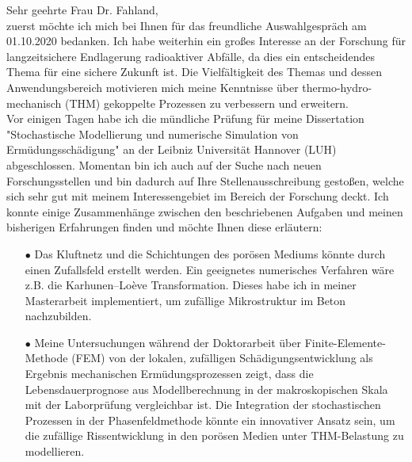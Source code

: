 \begin{adjustwidth}{0cm}{1cm}
	Sehr geehrte Frau Dr. Fahland,\\[1em]
	 zuerst möchte ich mich bei Ihnen  für das freundliche Auswahlgespräch am 01.10.2020 bedanken. Ich habe weiterhin ein großes Interesse an der Forschung für langzeitsichere Endlagerung radioaktiver Abfälle, da dies ein entscheidendes Thema für eine sichere Zukunft ist. %
	 Die Vielfältigkeit des Themas und dessen Anwendungsbereich motivieren mich meine Kenntnisse über thermo-hydro-mechanisch (THM) gekoppelte Prozessen zu verbessern und erweitern.\\[1em]
	  Vor einigen Tagen habe ich die mündliche Prüfung für meine Dissertation "Stochastische Modellierung und numerische Simulation von Ermüdungsschädigung" an der Leibniz Universität Hannover (LUH) abgeschlossen. Momentan bin ich auch auf der Suche nach neuen Forschungsstellen und bin dadurch auf Ihre Stellenausschreibung gestoßen, welche sich sehr gut mit meinem Interessengebiet im Bereich der Forschung deckt. %
	 Ich konnte einige Zusammenhänge zwischen den beschriebenen Aufgaben und meinen bisherigen Erfahrungen finden und möchte Ihnen diese  erläutern:\\[-0.5em]
		\begin{adjustwidth}{0.5cm}{0cm}
					\begin{itemize}	
	\item[$\bullet$] Das Kluftnetz und die Schichtungen des porösen Mediums könnte durch einen Zufallsfeld erstellt werden. Ein geeignetes numerisches Verfahren wäre z.B. die Karhunen–Loève Transformation. Dieses habe ich in meiner Masterarbeit implementiert, um zufällige Mikrostruktur im Beton nachzubilden.\\[-0.5em]
	\item[$\bullet$] Meine Untersuchungen während der Doktorarbeit über Finite-Elemente-Methode (FEM) von der lokalen, zufälligen Schädigungsentwicklung als Ergebnis mechanischen Ermüdungsprozessen zeigt, dass die Lebensdauerprognose aus Modellberechnung in der makroskopischen Skala mit der Laborprüfung vergleichbar ist. Die Integration der stochastischen Prozessen in der Phasenfeldmethode könnte ein innovativer Ansatz sein, um die zufällige Rissentwicklung in den porösen Medien unter THM-Belastung zu modellieren.\\[-0.5em]   

\end{itemize}
\end{adjustwidth}
\end{adjustwidth}
